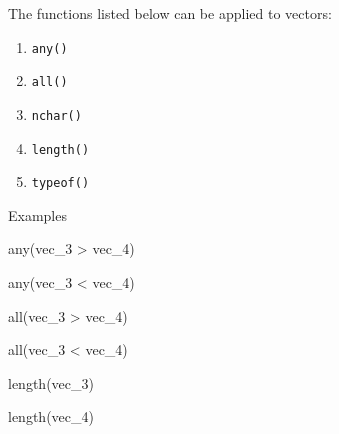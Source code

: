 \documentclass[
  letterpaper,
  DIV=11,
  numbers=noendperiod]{scrreprt}
\newenvironment{Shaded}{}{}
\newcommand{\FunctionTok}[1]{\textcolor[rgb]{0.44,0.26,0.76}{#1}}
\newcommand{\NormalTok}[1]{\textcolor[rgb]{0.14,0.16,0.18}{#1}}
\newcommand{\SpecialCharTok}[1]{\textcolor[rgb]{0.00,0.36,0.77}{#1}}
\begin{document}
The functions listed below can be applied to vectors:

\begin{enumerate}
\def\labelenumi{\alph{enumi}.}
\item
  \texttt{any()}
\item
  \texttt{all()}
\item
  \texttt{nchar()}
\item
  \texttt{length()}
\item
  \texttt{typeof()}
\end{enumerate}

Examples

\begin{Shaded}
\begin{Highlighting}[]
\FunctionTok{any}\NormalTok{(vec\_3 }\SpecialCharTok{\textgreater{}}\NormalTok{ vec\_4)}
\end{Highlighting}
\end{Shaded}

\begin{Shaded}
\begin{Highlighting}[]
\FunctionTok{any}\NormalTok{(vec\_3 }\SpecialCharTok{\textless{}}\NormalTok{ vec\_4)}
\end{Highlighting}
\end{Shaded}

\begin{Shaded}
\begin{Highlighting}[]
\FunctionTok{all}\NormalTok{(vec\_3 }\SpecialCharTok{\textgreater{}}\NormalTok{ vec\_4)}
\end{Highlighting}
\end{Shaded}

\begin{Shaded}
\begin{Highlighting}[]
\FunctionTok{all}\NormalTok{(vec\_3 }\SpecialCharTok{\textless{}}\NormalTok{ vec\_4)}
\end{Highlighting}
\end{Shaded}

\begin{Shaded}
\begin{Highlighting}[]
\FunctionTok{length}\NormalTok{(vec\_3)}
\end{Highlighting}
\end{Shaded}

\begin{Shaded}
\begin{Highlighting}[]
\FunctionTok{length}\NormalTok{(vec\_4)}
\end{Highlighting}
\end{Shaded}
\end{document}
